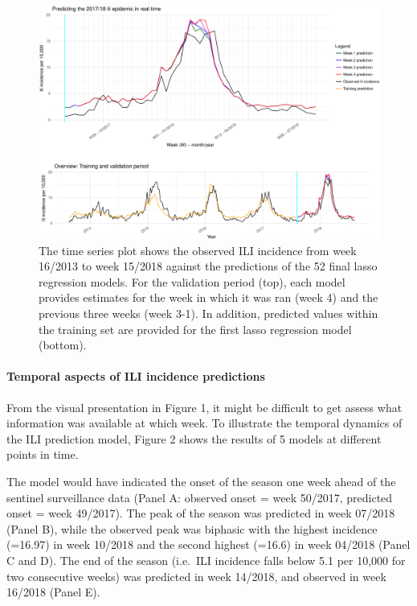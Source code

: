 \documentclass[]{article}
\let\oldparagraph\paragraph
\renewcommand{\paragraph}[1]{\oldparagraph{#1}\mbox{}}
\begin{document}
\begin{landscape}
\begin{figure}
\centering
\includegraphics{unnamed-chunk-3-1.pdf}
\caption{The time series plot shows the observed ILI incidence from week
16/2013 to week 15/2018 against the predictions of the 52 final lasso
regression models. For the validation period (top), each model provides
estimates for the week in which it was ran (week 4) and the previous
three weeks (week 3-1). In addition, predicted values within the
training set are provided for the first lasso regression model
(bottom).}
\end{figure}
\end{landscape}

\hypertarget{temporal-aspects-of-ili-incidence-predictions}{%
\paragraph{\texorpdfstring{\textbf{Temporal aspects of ILI incidence
predictions}}{Temporal aspects of ILI incidence predictions}}\label{temporal-aspects-of-ili-incidence-predictions}}

From the visual presentation in Figure 1, it might be difficult to get
assess what information was available at which week. To illustrate the
temporal dynamics of the ILI prediction model, Figure 2 shows the
results of 5 models at different points in time.

The model would have indicated the onset of the season one week ahead of
the sentinel surveillance data (Panel A: observed onset = week 50/2017,
predicted onset = week 49/2017). The peak of the season was predicted in
week 07/2018 (Panel B), while the observed peak was biphasic with the
highest incidence (=16.97) in week 10/2018 and the second highest
(=16.6) in week 04/2018 (Panel C and D). The end of the season (i.e.~ILI
incidence falls below 5.1 per 10,000 for two consecutive weeks) was
predicted in week 14/2018, and observed in week 16/2018 (Panel E).
\end{document}

